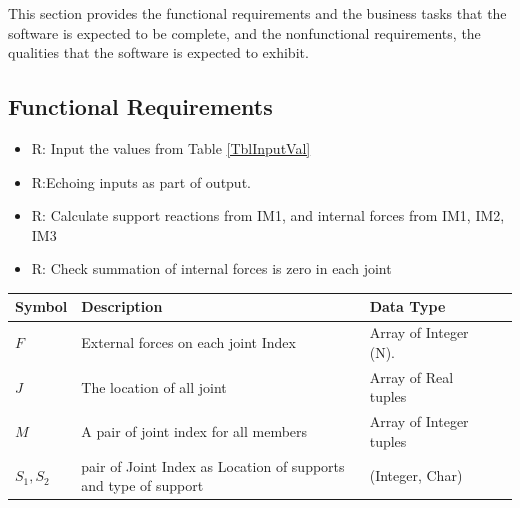 \documentclass[12pt]{article}
\newcounter{reqnum} %
\begin{document}
This section provides the functional requirements and the business tasks that the
software is expected to be complete, and the nonfunctional requirements, the
qualities that the software is expected to exhibit.

\subsection{Functional Requirements}

\noindent \begin{itemize}

\item{R\thereqnum \label{R_Inputs}: Input the values from Table \ref{TblInputVal}}

\item{R\thereqnum \label{R_OutputInputs}:Echoing inputs as part of output.} 

\item{R\thereqnum \label{R_Calculate}: Calculate support reactions from IM1, and internal forces from IM1, IM2, IM3}

\item{R\thereqnum \label{R_VerifyOutput}: Check summation of internal forces is zero in each joint}


\end{itemize}
\begin{table}[!h]
	\caption{Required Inputs} \label{TblInputVal}
	\renewcommand{\arraystretch}{1.2}
	\noindent \begin{longtable*}{l l l l c} 
		\toprule
		\textbf{Symbol} & \textbf{Description} & \textbf{Data Type} \\
		\midrule 
		$F$  & External forces on each joint Index  & Array of Integer (\si{\newton}). \\
		$J$  & The location of all joint & Array of Real tuples \\
		$M$  & A pair of joint index for all members &Array of Integer tuples \\
		
		$S_1, S_2$ & pair of Joint Index as Location of supports and type of support   &(Integer, Char) \\
		\bottomrule
		
	\end{longtable*}
\end{table}
\end{document}
